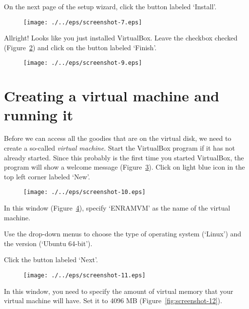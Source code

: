 On the next page of the setup wizard, click the button labeled `Install'.

\begin{figure}[ht]
  \centering
    \texttt{[image: ./../eps/screenshot-7.eps]}
  \caption{}
  \label{fig:screenshot-7}
\end{figure}



Allright! Looks like you just installed VirtualBox. Leave the checkbox checked (Figure~\ref{fig:screenshot-9}) and click on the button labeled `Finish'.
\begin{figure}[ht]
  \centering
    \texttt{[image: ./../eps/screenshot-9.eps]}
  \caption{}
  \label{fig:screenshot-9}
\end{figure}
\clearpage


\section{Creating a virtual machine and running it}
\label{sec:creating-virtual-machine}

Before we can access all the goodies that are on the virtual disk, we need to create a so-called \textit{virtual machine}. Start the VirtualBox program if it has not already started. Since this probably is the first time you started VirtualBox, the program will show a welcome message (Figure~\ref{fig:screenshot-10}). Click on light blue icon in the top left corner labeled `New'.

\begin{figure}[ht]
  \centering
    \texttt{[image: ./../eps/screenshot-10.eps]}
  \caption{}
  \label{fig:screenshot-10}
\end{figure}


In this window (Figure~\ref{fig:screenshot-11}), specify `ENRAMVM' as the name of the virtual machine.

Use the drop-down menus to choose the type of operating system (`Linux') and the version (`Ubuntu 64-bit').

Click the button labeled `Next'.


\begin{figure}[ht]
  \centering
    \texttt{[image: ./../eps/screenshot-11.eps]}
  \caption{}
  \label{fig:screenshot-11}
\end{figure}
\clearpage

In this window, you need to specify the amount of virtual memory that your virtual machine will have. Set it to 4096 MB (Figure~\ref{fig:screenshot-12}).

